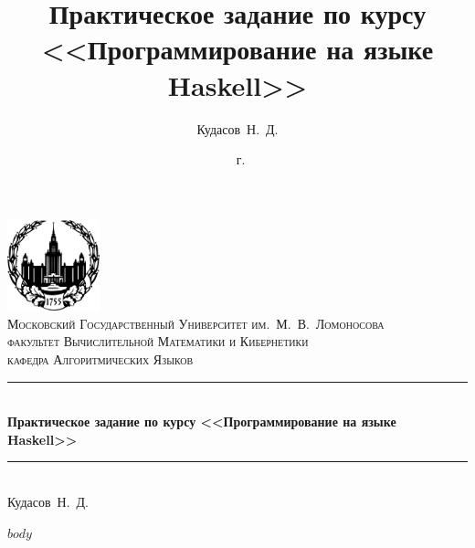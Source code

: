 \documentclass[12pt]{report}
\title{Практическое задание по курсу <<Программирование на языке Haskell>>}
\author{Кудасов~Н.~Д.}
\date{\the\year~г.}
\numberwithin{figure}{section}
\newcommand{\HRule}{\rule{\linewidth}{0.5mm}}
\begin{document}
\begin{titlepage}
\begin{center}

\includegraphics[width=0.2\textwidth]{images/msu}~\\[0.5cm]

\textsc{\large Московский Государственный Университет им.~М.~В.~Ломоносова}\\[0.3cm]
\textsc{\small
  факультет Вычислительной Математики и Кибернетики\\
  кафедра Алгоритмических Языков}\\[1.5cm]

\HRule \\[0.4cm]
{ \Large \bfseries Практическое задание по курсу <<Программирование на языке Haskell>> \\[0.4cm] }

\HRule \\[1.5cm]

{\large Кудасов~Н.~Д.}

\vfill

{\large \the\year}

\end{center}
\end{titlepage}
\thispagestyle{empty}

\setcounter{tocdepth}{1}
\tableofcontents

\newcommand{\sectionbreak}{\clearpage}

$body$
\end{document}
